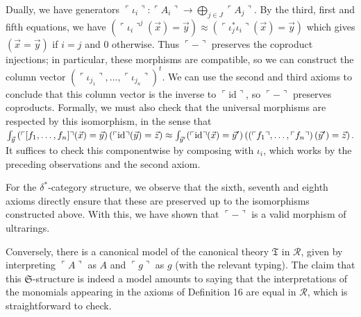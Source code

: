 \documentclass[10pt,a4paper]{amsart}
\begin{document}
 
 
Dually, we have generators $\ulcorner\iota_{i}\urcorner:\ulcorner A_{i}\urcorner\to\bigoplus_{j\in J}%
\ulcorner A_{j}\urcorner$. By the third, first and fifth equations, we have $\left(\ulcorner\iota_{i}\urcorner^{j}(\vec{x})=\vec{y}\right)\approx\left(%
\ulcorner\iota^{*}_{j}\iota_{i}\urcorner(\vec{x})=\vec{y}\right)$ which gives $(\vec{x}=\vec{y})$ if $i=j$ and $0$ otherwise. Thus $\ulcorner-\urcorner$ preserves the coproduct injections; in particular, these morphisms are compatible, so we can construct the column vector $(\ulcorner\iota_{j_{1}}\urcorner,\dotsc,\ulcorner\iota_{j_{n}}\urcorner)^{t}$. We can use the second and third axioms to conclude that this column vector is the inverse to $\ulcorner\mathrm{id}\urcorner$, so $\ulcorner-\urcorner$ preserves coproducts. Formally, we must also check that the universal morphisms are respected by this isomorphism, in the sense that $\int_{\vec{y}}\left(\ulcorner[f_{1},\dotsc,f_{n}]\urcorner(\vec{x})=\vec{y}%
\right)(\ulcorner\mathrm{id}\urcorner(\vec{y})=\vec{z})\approx\int_{\vec{y}^{%
\prime}}(\ulcorner\mathrm{id}\urcorner(\vec{x})=\vec{y}^{\prime})\left(\left(%
\ulcorner f_{1}\urcorner,\dotsc,\ulcorner f_{n}\urcorner\right)(\vec{y}^{%
\prime})=\vec{z}\right).$ It suffices to check this componentwise by composing with $\iota_{i}$, which works by the preceding observations and the second axiom.\par
 
 
 
For the $\delta^{*}$-category structure, we observe that the sixth, seventh and eighth axioms directly ensure that these are preserved up to the isomorphisms constructed above. With this, we have shown that $\ulcorner-\urcorner$ is a valid morphism of ultrarings.\par
 
 
 
Conversely, there is a canonical model of the canonical theory $\mathfrak{T}$ in $\mathcal{R}$, given by interpreting $\ulcorner A\urcorner$ as $A$ and $\ulcorner g\urcorner$ as $g$ (with the relevant typing). The claim that this $\mathfrak{S}$-structure is indeed a model amounts to saying that the interpretations of the monomials appearing in the axioms of Definition 16 are equal in $\mathcal{R}$, which is straightforward to check.\par
 
\end{document}
